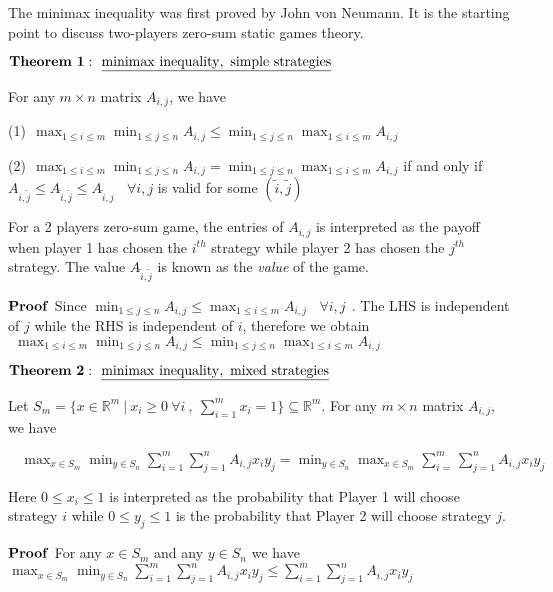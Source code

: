 \documentclass[12pt]{article}
\begin{document}
The minimax inequality was first proved by John von Neumann. It is the starting point to discuss two-players zero-sum static games theory. 

\smallskip

${\bf Theorem ~1:}~~\underline{\rm minimax~inequality,~simple~strategies}$

For any $m\times n$ matrix $A_{i,j}$, we have

(1)$~~\displaystyle{ \max_{1\leq i\leq m} \min_{1\leq j\leq n}A_{i,j} \leq
\min_{1\leq j\leq n}\max_{1\leq i\leq m}A_{i,j} }$

(2)$~~\displaystyle{ \max_{1\leq i\leq m} \min_{1\leq j\leq n}A_{i,j} =
\min_{1\leq j\leq n}\max_{1\leq i\leq m}A_{i,j} }$ if and only if $A_{i,{\tilde j}}\leq A_{{\tilde i},{\tilde j}}
\leq A_{{\tilde i},j}~~~~\forall i,j$ is valid for some $({\tilde i},{\tilde j})$

For a 2 players zero-sum game, the entries of $A_{i,j}$ is interpreted as the payoff when player 1 has chosen the $i^{th}$ strategy while player 2 has chosen the $j^{th}$ strategy. The value $A_{{\tilde i},{\tilde j}}$ is known as the {\sl value} of the game.

${\bf Proof}$ Since $\displaystyle{ \min_{1\leq j\leq n} A_{i,j}\leq \max_{1\leq i\leq m}A_{i,j}~~~~\forall i,j }~~$.
The LHS is independent of $j$ while the RHS is independent of $i$, therefore we obtain
$~~\displaystyle{ \max_{1\leq i\leq m} \min_{1\leq j\leq n}A_{i,j} \leq
\min_{1\leq j\leq n}\max_{1\leq i\leq m}A_{i,j} }$

\smallskip

${\bf Theorem ~2:}~~\underline{\rm minimax~inequality,~mixed~strategies}$

Let $\displaystyle{S_m=\{x\in {\mathbb R}^m~\vert~x_i\geq 0~\forall i~,~\sum_{i=1}^mx_i=1\}\subseteq {\mathbb R}^{m} }$. 
For any $m\times n$ matrix $A_{i,j}$, we have

$~~~~\displaystyle{ \max_{x\in S_m} \min_{y\in S_n}\sum_{i=1}^m\sum_{j=1}^nA_{i,j}x_iy_j =
\min_{y\in S_n}\max_{x\in S_m}\sum_{i=}^m\sum_{j=1}^nA_{i,j}x_iy_j }$

Here $0\leq x_i\leq 1$ is interpreted as the probability that Player 1 will choose strategy $i$ while $0\leq y_j\leq 1$ is the probability that Player 2 will choose strategy $j$.

${\bf Proof}$ For any $x\in S_m$ and any $y\in S_n$ we have $\displaystyle{\max_{x\in S_m}\min_{y\in S_n}\sum_{i=1}^m\sum_{j=1}^nA_{i,j}x_iy_j\leq\sum_{i=1}^m\sum_{j=1}^nA_{i,j}x_iy_j }$
\end{document}
